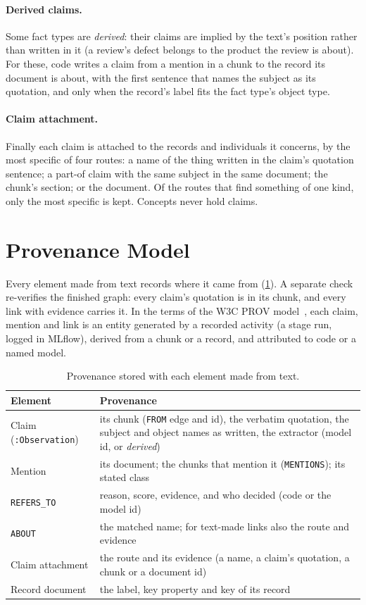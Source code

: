 \paragraph{Derived claims.} Some fact types are \emph{derived}: their claims are implied by the text's position
rather than written in it (a review's defect belongs to the product the review is about). For these, code writes a
claim from a mention in a chunk to the record its document is about, with the first sentence that names the
subject as its quotation, and only when the record's label fits the fact type's object type.

\paragraph{Claim attachment.} Finally each claim is attached to the records and individuals it concerns, by the
most specific of four routes: a name of the thing written in the claim's quotation sentence; a part-of claim
with the same subject in the same document; the chunk's section; or the document. Of the routes that find
something of one kind, only the most specific is kept. Concepts never hold claims.

\section{Provenance Model}\label{sec:ch04-provenance}

Every element made from text records where it came from (\cref{tab:provenance}). A separate check re-verifies the
finished graph: every claim's quotation is in its chunk, and every link with evidence carries it. In the terms of
the W3C PROV model~\cite{moreau2013provdm}, each claim, mention and link is an entity generated by a recorded
activity (a stage run, logged in MLflow), derived from a chunk or a record, and attributed to code or a named
model.

\begin{table}[htbp]
\centering
\caption{Provenance stored with each element made from text.}
\label{tab:provenance}
\small
\begin{tabularx}{\linewidth}{@{}lX@{}}
\toprule
Element & Provenance \\
\midrule
Claim (\texttt{:Observation}) & its chunk (\texttt{FROM} edge and id), the verbatim quotation, the subject and object names as written, the extractor (model id, or \emph{derived}) \\
Mention & its document; the chunks that mention it (\texttt{MENTIONS}); its stated class \\
\texttt{REFERS\_TO} & reason, score, evidence, and who decided (code or the model id) \\
\texttt{ABOUT} & the matched name; for text-made links also the route and evidence \\
Claim attachment & the route and its evidence (a name, a claim's quotation, a chunk or a document id) \\
Record document & the label, key property and key of its record \\
\bottomrule
\end{tabularx}
\end{table}

